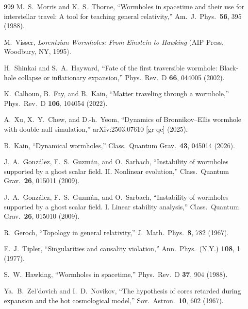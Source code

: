 \documentclass[twocolumn,floatfix,aps,prd,superscriptaddress,nofootinbib]{revtex4-2}
\begin{document}
\begin{thebibliography}{999}
M.~S.~Morris and K.~S.~Thorne,
\newblock ``Wormholes in spacetime and their use for interstellar travel: A tool for teaching general relativity,''
\newblock Am.\ J.\ Phys.\ \textbf{56}, 395 (1988).

M.~Visser,
\newblock \emph{Lorentzian Wormholes: From Einstein to Hawking}
\newblock (AIP Press, Woodbury, NY, 1995).

H.~Shinkai and S.~A.~Hayward,
\newblock ``Fate of the first traversible wormhole: Black-hole collapse or inflationary expansion,''
\newblock Phys.\ Rev.\ D \textbf{66}, 044005 (2002).

K.~Calhoun, B.~Fay, and B.~Kain,
\newblock ``Matter traveling through a wormhole,''
\newblock Phys.\ Rev.\ D \textbf{106}, 104054 (2022).

A.~Xu, X.~Y.~Chew, and D.-h.~Yeom,
\newblock ``Dynamics of Bronnikov--Ellis wormhole with double-null simulation,''
\newblock arXiv:2503.07610 [gr-qc] (2025).

B.~Kain,
\newblock ``Dynamical wormholes,''
\newblock Class.\ Quantum Grav.\ \textbf{43}, 045014 (2026).

J.~A.~Gonz\'alez, F.~S.~Guzm\'an, and O.~Sarbach,
\newblock ``Instability of wormholes supported by a ghost scalar field. II. Nonlinear evolution,''
\newblock Class.\ Quantum Grav.\ \textbf{26}, 015011 (2009).

J.~A.~Gonz\'alez, F.~S.~Guzm\'an, and O.~Sarbach,
\newblock ``Instability of wormholes supported by a ghost scalar field. I. Linear stability analysis,''
\newblock Class.\ Quantum Grav.\ \textbf{26}, 015010 (2009).

R.~Geroch,
\newblock ``Topology in general relativity,''
\newblock J.\ Math.\ Phys.\ \textbf{8}, 782 (1967).

F.~J.~Tipler,
\newblock ``Singularities and causality violation,''
\newblock Ann.\ Phys.\ (N.Y.) \textbf{108}, 1 (1977).

S.~W.~Hawking,
\newblock ``Wormholes in spacetime,''
\newblock Phys.\ Rev.\ D \textbf{37}, 904 (1988).

Ya.~B.~Zel'dovich and I.~D.~Novikov,
\newblock ``The hypothesis of cores retarded during expansion and the hot cosmological model,''
\newblock Sov.\ Astron.\ \textbf{10}, 602 (1967).


\end{thebibliography}
\end{document}
